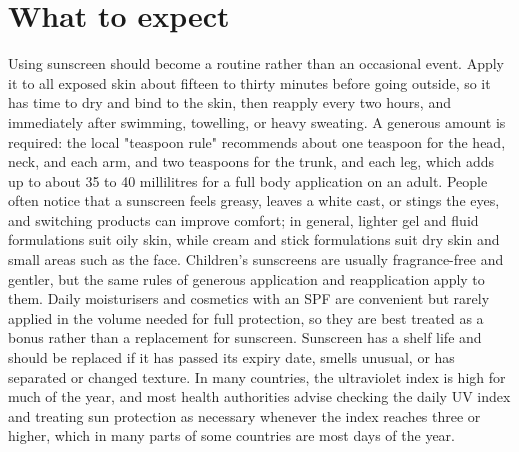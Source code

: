 \section*{What to expect}
Using sunscreen should become a routine rather than an occasional event. Apply it to all exposed skin about fifteen to thirty minutes before going outside, so it has time to dry and bind to the skin, then reapply every two hours, and immediately after swimming, towelling, or heavy sweating. A generous amount is required: the local "teaspoon rule" recommends about one teaspoon for the head, neck, and each arm, and two teaspoons for the trunk, and each leg, which adds up to about 35 to 40 millilitres for a full body application on an adult. People often notice that a sunscreen feels greasy, leaves a white cast, or stings the eyes, and switching products can improve comfort; in general, lighter gel and fluid formulations suit oily skin, while cream and stick formulations suit dry skin and small areas such as the face. Children's sunscreens are usually fragrance-free and gentler, but the same rules of generous application and reapplication apply to them. Daily moisturisers and cosmetics with an SPF are convenient but rarely applied in the volume needed for full protection, so they are best treated as a bonus rather than a replacement for sunscreen. Sunscreen has a shelf life and should be replaced if it has passed its expiry date, smells unusual, or has separated or changed texture. In many countries, the ultraviolet index is high for much of the year, and most health authorities advise checking the daily UV index and treating sun protection as necessary whenever the index reaches three or higher, which in many parts of some countries are most days of the year.

